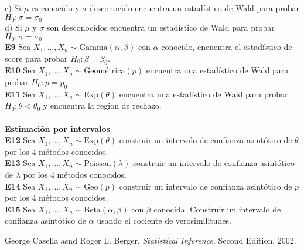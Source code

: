 \documentclass[11pt,spanish]{article}
\begin{document}
\hspace*{6mm} c) Si $\mu$ es conocido y $\sigma$ desconocido encuentra un estadístico de Wald para probar $H_0:\sigma=\sigma_0$
\\
\hspace*{6mm} d) Si $\mu$ y $\sigma$ son desconocidos encuentra un estadístico de Wald para probar $H_0:\sigma=\sigma_0$\\
\textbf{E9} Sea $X_1,...,X_n\sim \text{Gamma}(\alpha,\beta)$ con $\alpha$ conocido, encuentra el estadístico de score para probar $H_0:\beta=\beta_0$. \\
\textbf{E10} Sea $X_1,...,X_n\sim \text{Geométrica}(p)$ encuentra una estadístico de Wald para probar  $H_0:p=p_0$\\
\textbf{E11} Sea $X_1,...,X_n\sim \text{Exp}(\theta)$ encuentra una estadístico de Wald para probar  $H_0:\theta<\theta_0$ y encuentra la region de rechazo.\\\\
\textbf{Estimación por intervalos} \\
\textbf{E12} Sea $X_1,...,X_n\sim \text{Exp}(\theta)$ construir un intervalo de confianza asintótico de $\theta$ por los 4 métodos conocidos. \\
\textbf{E13} Sea $X_1,...,X_n\sim \text{Poisson}(\lambda)$ construir un intervalo de confianza asintótico de $\lambda$ por los 4 métodos conocidos. \\
\textbf{E14} Sea $X_1,...,X_n\sim \text{Geo}(p)$ construir un intervalo de confianza asintótico de $p$ por los 4 métodos conocidos. \\
\textbf{E15} Sea $X_1,...,X_n\sim \text{Beta}(\alpha,\beta)$ con $\beta$ conocida. Construir un intervalo de confianza asintótico de $\alpha$ usando el cociente de verosimilitudes.

\begin{thebibliography}{9}
George Casella asnd Roger L. Berger, \textit{Statistical Inference}. 
Second Edition, 2002.
\end{thebibliography}
\end{document}
